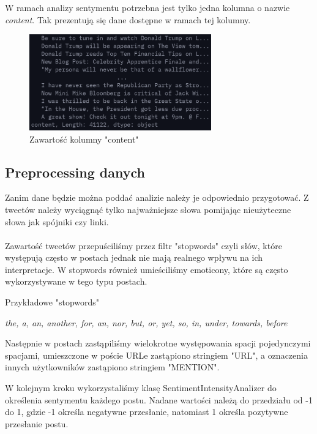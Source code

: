 \documentclass{article}
\begin{document}
    \noindent W ramach analizy sentymentu potrzebna jest tylko jedna kolumna o nazwie \emph{content}. Tak prezentują się dane dostępne w ramach tej kolumny.

    \begin{figure}[H]
        \centering
        \includegraphics[width=0.7\textwidth]{dataset_content.png}
        \caption{Zawartość kolumny "content"}
    \end{figure}

\subsection{Preprocessing danych}
    Zanim dane będzie można poddać analizie należy je odpowiednio przygotować.
    Z tweetów należy wyciągnąć tylko najważniejsze słowa pomijając nieużyteczne
    słowa jak spójniki czy linki. 
    \\
    \\
    \noindent Zawartość tweetów przepuściliśmy przez filtr "stopwords" czyli słów, które występują często w postach jednak nie mają realnego wpływu na ich interpretacje.
    W stopwords również umieściliśmy emoticony, które są często wykorzystywane w tego typu postach. \\[12px]
    
    \centerline{Przykładowe "stopwords"}  
    \centerline{\emph{the, a, an, another, for, an, nor, but, or, yet, so,  in, under, towards, before \\[12px]}}

    \noindent Następnie w postach zastąpiliśmy wielokrotne występowania spacji pojedynczymi spacjami, umieszczone w poście URLe zastąpiono stringiem "URL", a oznaczenia innych użytkowników zastąpiono stringiem "MENTION". \newline 
    
    
    \noindent W kolejnym kroku wykorzystaliśmy klasę SentimentIntensityAnalizer do określenia sentymentu każdego postu.
    Nadane wartości należą do przedziału od -1 do 1, gdzie -1 określa negatywne 
    przesłanie, natomiast 1 określa pozytywne przesłanie postu.\newline
    
\end{document}
